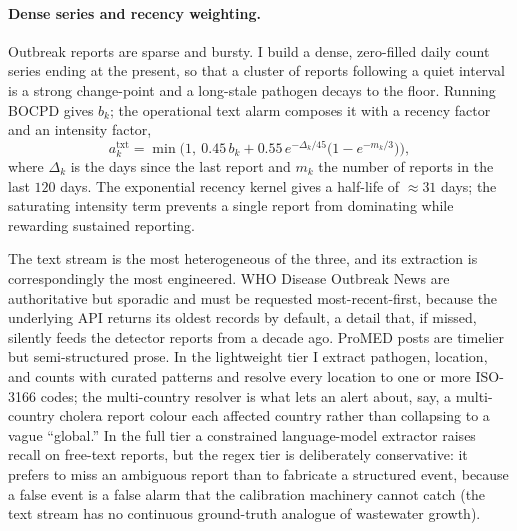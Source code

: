 \documentclass[10pt,twocolumn]{article}
\theoremstyle{definition}
\begin{document}
\paragraph{Dense series and recency weighting.}
Outbreak reports are sparse and bursty. I build a dense, zero-filled daily count
series ending at the present, so that a cluster of reports following a quiet
interval is a strong change-point and a long-stale pathogen decays to the floor.
Running BOCPD gives $b_k$; the operational text alarm composes it with a recency
factor and an intensity factor,
\begin{equation}
a^{\mathrm{txt}}_k = \min\!\Big(1,\ 0.45\,b_k + 0.55\,e^{-\Delta_k/45}\big(1-e^{-m_k/3}\big)\Big),
\label{eq:text-alarm}
\end{equation}
where $\Delta_k$ is the days since the last report and $m_k$ the number of
reports in the last $120$ days. The exponential recency kernel gives a half-life
of $\approx31$ days; the saturating intensity term prevents a single report from
dominating while rewarding sustained reporting.

The text stream is the most heterogeneous of the three, and its extraction is
correspondingly the most engineered. WHO Disease Outbreak News are authoritative
but sporadic and must be requested most-recent-first, because the underlying API
returns its oldest records by default, a detail that, if missed, silently feeds
the detector reports from a decade ago. ProMED posts are timelier but
semi-structured prose. In the lightweight tier I extract pathogen, location, and
counts with curated patterns and resolve every location to one or more ISO-3166
codes; the multi-country resolver is what lets an alert about, say, a multi-country
cholera report colour each affected country rather than collapsing to a vague
``global.'' In the full tier a constrained language-model extractor raises recall
on free-text reports, but the regex tier is deliberately conservative: it prefers
to miss an ambiguous report than to fabricate a structured event, because a false
event is a false alarm that the calibration machinery cannot catch (the text
stream has no continuous ground-truth analogue of wastewater growth).
\end{document}
